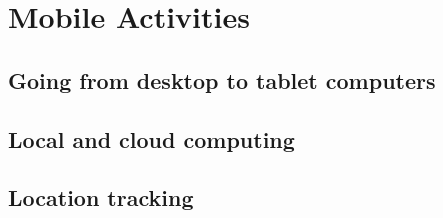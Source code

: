 \chapter{Mobile Activities}

\section{Going from desktop to tablet computers}


\section{Local and cloud computing}


\section{Location tracking}


